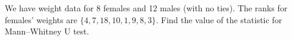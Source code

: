 
\begin{question}
We have weight data for 8 females and 12 males (with no ties). The ranks for females' weights are \(\{4, 7, 18, 10, 1, 9, 8, 3\}\). Find the value of the statistic for Mann--Whitney U test.
\end{question}


